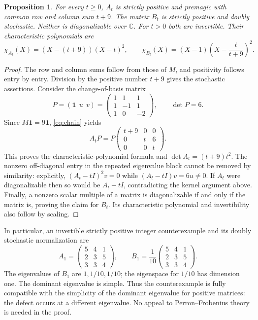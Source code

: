 \documentclass[11pt]{article}
\newtheorem{proposition}[theorem]{Proposition}
\theoremstyle{remark}\newtheorem{remark}[theorem]{Remark}
\newcommand{\C}{\mathbb C}
\newcommand{\one}{\mathbf 1}
\begin{document}
\begin{proposition}\label{prop:family}
For every $t\geq0$, $A_t$ is strictly positive and premagic with common
row and column sum $t+9$. The matrix $B_t$ is strictly positive and
doubly stochastic. Neither is diagonalizable over $\C$.
For $t>0$ both are invertible. Their characteristic polynomials are
\[
 \chi_{A_t}(X)=(X-(t+9))(X-t)^2,
 \qquad
 \chi_{B_t}(X)=(X-1)\left(X-\frac{t}{t+9}\right)^2.
\]
\end{proposition}
\begin{proof}
The row and column sums follow from those of $M$, and positivity follows
entry by entry. Division by the positive number $t+9$ gives the
stochastic assertions. Consider the change-of-basis matrix
\[
 P=(\one\ \ u\ \ v)
 =\begin{pmatrix}1&1&1\\1&-1&1\\1&0&-2\end{pmatrix},\qquad \det P=6.
\]
Since $M\one=9\one$, \eqref{eq:chain} yields
\begin{equation}\label{eq:jordan}
 A_tP=P\begin{pmatrix}t+9&0&0\\0&t&6\\0&0&t\end{pmatrix}.
\end{equation}
This proves the characteristic-polynomial formula and
$\det A_t=(t+9)t^2$. The nonzero off-diagonal entry in the repeated
eigenvalue block cannot be removed by similarity: explicitly,
$(A_t-tI)^2v=0$ while $(A_t-tI)v=6u\ne0$.
If $A_t$ were diagonalizable then so would be $A_t-tI$, contradicting
the kernel argument above. Finally, a nonzero scalar multiple of a
matrix is diagonalizable if and only if the matrix is, proving the
claim for $B_t$. Its characteristic polynomial and invertibility also
follow by scaling.
\end{proof}

In particular, an invertible strictly positive integer counterexample
and its doubly stochastic normalization are
\begin{equation}\label{eq:invertible}
 A_1=\begin{pmatrix}5&4&1\\2&3&5\\3&3&4\end{pmatrix},
 \qquad B_1=\frac1{10}\begin{pmatrix}5&4&1\\2&3&5\\3&3&4\end{pmatrix}.
\end{equation}
The eigenvalues of $B_1$ are $1,1/10,1/10$; the eigenspace for $1/10$
has dimension one. The dominant eigenvalue is simple. Thus the
counterexample is fully compatible with the simplicity of the dominant
eigenvalue for positive matrices: the defect occurs at a different
eigenvalue. No appeal to Perron--Frobenius theory is needed in the proof.
\end{document}
